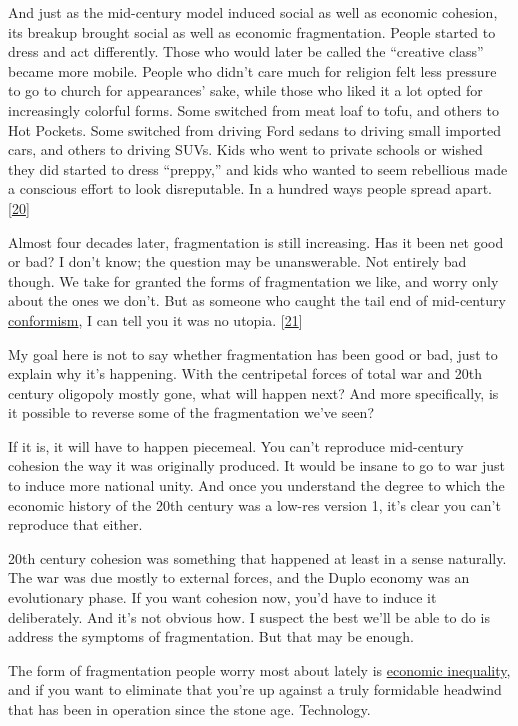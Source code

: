 And just as the mid-century model induced social as well as economic
cohesion, its breakup brought social as well as economic fragmentation.
People started to dress and act differently. Those who would later be
called the ``creative class'' became more mobile. People who didn't care
much for religion felt less pressure to go to church for appearances'
sake, while those who liked it a lot opted for increasingly colorful
forms. Some switched from meat loaf to tofu, and others to Hot Pockets.
Some switched from driving Ford sedans to driving small imported cars,
and others to driving SUVs. Kids who went to private schools or wished
they did started to dress ``preppy,'' and kids who wanted to seem
rebellious made a conscious effort to look disreputable. In a hundred
ways people spread apart. {[}\hyperref[f20n]{20}{]}

Almost four decades later, fragmentation is still increasing. Has it
been net good or bad? I don't know; the question may be unanswerable.
Not entirely bad though. We take for granted the forms of fragmentation
we like, and worry only about the ones we don't. But as someone who
caught the tail end of mid-century
\href{https://books.google.com/ngrams/graph?content=well-adjusted&year_start=1800&year_end=2000&corpus=15&smoothing=3}{conformism},
I can tell you it was no utopia. {[}\hyperref[f21n]{21}{]}

My goal here is not to say whether fragmentation has been good or bad,
just to explain why it's happening. With the centripetal forces of total
war and 20th century oligopoly mostly gone, what will happen next? And
more specifically, is it possible to reverse some of the fragmentation
we've seen?

If it is, it will have to happen piecemeal. You can't reproduce
mid-century cohesion the way it was originally produced. It would be
insane to go to war just to induce more national unity. And once you
understand the degree to which the economic history of the 20th century
was a low-res version 1, it's clear you can't reproduce that either.

20th century cohesion was something that happened at least in a sense
naturally. The war was due mostly to external forces, and the Duplo
economy was an evolutionary phase. If you want cohesion now, you'd have
to induce it deliberately. And it's not obvious how. I suspect the best
we'll be able to do is address the symptoms of fragmentation. But that
may be enough.

The form of fragmentation people worry most about lately is
\href{ineq.html}{economic inequality}, and if you want to eliminate that
you're up against a truly formidable headwind that has been in operation
since the stone age. Technology.

